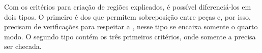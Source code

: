 

Com os critérios para criação de regiões explicados, é possível diferenciá-los em dois tipos.
O primeiro é dos que permitem sobreposição entre peças e, por isso, precisam de verificações para
respeitar a , nesse tipo se encaixa somente o quarto modo.
O segundo tipo contém os três primeiros critérios, onde somente a  precisa ser checada.
